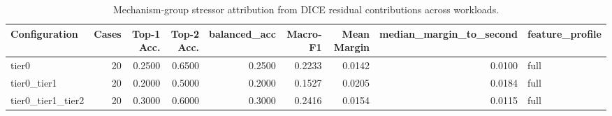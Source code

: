\begin{table}[t]
\centering
\caption{Mechanism-group stressor attribution from DICE residual contributions across workloads.}
\label{tab:dice_stressor_diagnosis}
\footnotesize
\begin{tabular}{lrrrrrrrl}
\toprule
Configuration & Cases & Top-1 Acc. & Top-2 Acc. & balanced_acc & Macro-F1 & Mean Margin & median_margin_to_second & feature_profile \\
\midrule
tier0 & 20 & 0.2500 & 0.6500 & 0.2500 & 0.2233 & 0.0142 & 0.0100 & full \\
tier0_tier1 & 20 & 0.2000 & 0.5000 & 0.2000 & 0.1527 & 0.0205 & 0.0184 & full \\
tier0_tier1_tier2 & 20 & 0.3000 & 0.6000 & 0.3000 & 0.2416 & 0.0154 & 0.0115 & full \\
\bottomrule
\end{tabular}

\end{table}
